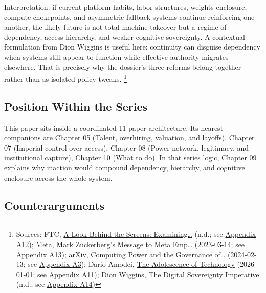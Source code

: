 \documentclass[
  american,
  11pt,
  letterpaper,
]{article}
\begin{document}
Interpretation: if current platform habits, labor structures, weights
enclosure, compute chokepoints, and asymmetric fallback systems continue
reinforcing one another, the likely future is not total machine takeover
but a regime of dependency, access hierarchy, and weaker cognitive
sovereignty. A contextual formulation from Dion Wiggins is useful here:
continuity can disguise dependency when systems still appear to function
while effective authority migrates elsewhere. That is precisely why the
dossier's three reforms belong together rather than as isolated policy
tweaks. \footnote{Sources: FTC,
  \href{https://www.ftc.gov/reports/look-behind-screens-examining-data-practices-social-media-video-streaming-services}{A
  Look Behind the Screens: Examining\ldots{}} (n.d.; see
  \hyperref[appendix-a12-a-look-behind-the-screens-examining-the-data-practices-of-social-media-and-video-streaming-services]{Appendix
  A12}); Meta,
  \href{https://about.fb.com/news/2023/03/mark-zuckerberg-meta-year-of-efficiency/}{Mark
  Zuckerberg's Message to Meta Emp\ldots{}} (2023-03-14; see
  \hyperref[appendix-a13-mark-zuckerberg-s-message-to-meta-employees]{Appendix
  A13}); arXiv, \href{https://arxiv.org/abs/2402.08797}{Computing Power
  and the Governance of\ldots{}} (2024-02-13; see
  \hyperref[appendix-a3-computing-power-and-the-governance-of-artificial-intelligence]{Appendix
  A3}); Dario Amodei,
  \href{https://darioamodei.com/essay/the-adolescence-of-technology}{The
  Adolescence of Technology} (2026-01-01; see
  \hyperref[appendix-a11-the-adolescence-of-technology]{Appendix A11});
  Dion Wiggins, \href{https://digitalsovereigntyimperative.com/}{The
  Digital Sovereignty Imperative} (n.d.; see
  \hyperref[appendix-a14-the-digital-sovereignty-imperative]{Appendix
  A14})}

\subsection{Position Within the
Series}\label{position-within-the-series}

This paper sits inside a coordinated 11-paper architecture. Its nearest
companions are Chapter 05 (Talent, overhiring, valuation, and layoffs),
Chapter 07 (Imperial control over access), Chapter 08 (Power network,
legitimacy, and institutional capture), Chapter 10 (What to do). In that
series logic, Chapter 09 explains why inaction would compound
dependency, hierarchy, and cognitive enclosure across the whole system.

\subsection{Counterarguments}\label{counterarguments}
\end{document}
